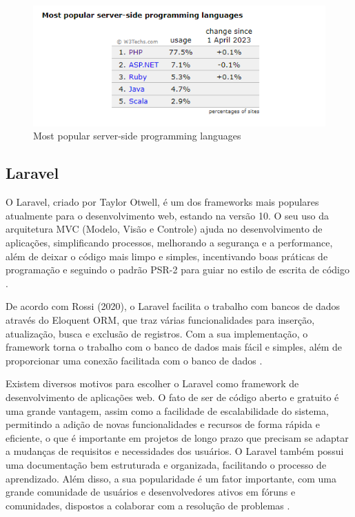 \begin{figure}[htb]
     \centering
     \includegraphics[width=14cm]{arquivos/Figuras/usodophp.png}
     \caption{Most popular server-side programming languages}
     \label{fig:PHP}
\end{figure}

\newpage
\subsection{Laravel}
O Laravel, criado por Taylor Otwell, é um dos frameworks mais populares atualmente para o desenvolvimento web, estando na versão 10. O seu uso da arquitetura \gls{MVC} (Modelo, Visão e Controle) ajuda no desenvolvimento de aplicações, simplificando processos, melhorando a segurança e a performance, além de deixar o código mais limpo e simples, incentivando boas práticas de programação e seguindo o padrão PSR-2 para guiar no estilo de escrita de código \cite{Weldell}.

De acordo com Rossi (2020), o Laravel facilita o trabalho com bancos de dados através do Eloquent \gls{ORM}, que traz várias funcionalidades para inserção, atualização, busca e exclusão de registros. Com a sua implementação, o framework torna o trabalho com o banco de dados mais fácil e simples, além de proporcionar uma conexão facilitada com o banco de dados \cite{Weldell}.

Existem diversos motivos para escolher o Laravel como framework de desenvolvimento de aplicações web. O fato de ser de código aberto e gratuito é uma grande vantagem, assim como a facilidade de escalabilidade do sistema, permitindo a adição de novas funcionalidades e recursos de forma rápida e eficiente, o que é importante em projetos de longo prazo que precisam se adaptar a mudanças de requisitos e necessidades dos usuários. O Laravel também possui uma documentação bem estruturada e organizada, facilitando o processo de aprendizado. Além disso, a sua popularidade é um fator importante, com uma grande comunidade de usuários e desenvolvedores ativos em fóruns e comunidades, dispostos a colaborar com a resolução de problemas \cite{MeloLaravel}.

